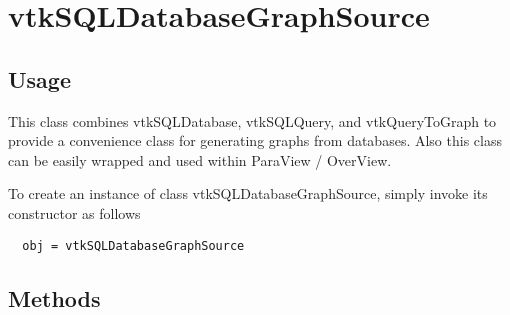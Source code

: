 \section{vtkSQLDatabaseGraphSource}

\subsection{Usage}

 This class combines vtkSQLDatabase, vtkSQLQuery, and vtkQueryToGraph to
 provide a convenience class for generating graphs from databases. 
 Also this class can be easily wrapped and used within ParaView / OverView.

To create an instance of class vtkSQLDatabaseGraphSource, simply
invoke its constructor as follows
\begin{verbatim}
  obj = vtkSQLDatabaseGraphSource
\end{verbatim}
\subsection{Methods}

